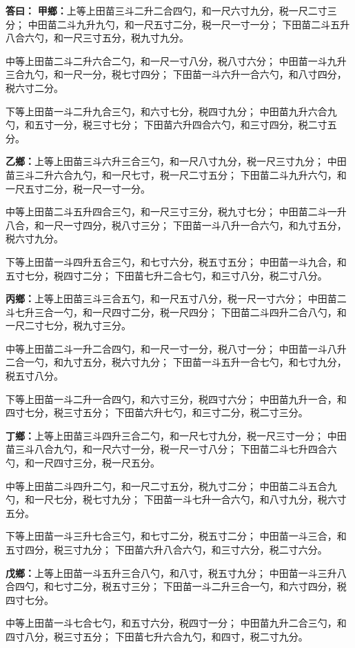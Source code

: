 \documentclass[11pt,a4paper]{article}
\newcommand{\Answer}[1]{\par\noindent\textbf{\color{answercolor}答曰：}#1\par}
\begin{document}
\Answer{
\textbf{甲鄉：}上等上田苗三斗二升二合四勺，和一尺六寸九分，税一尺二寸三分；
中田苗二斗九升九勺，和一尺五寸二分，税一尺一寸一分；
下田苗二斗五升八合六勺，和一尺三寸五分，税九寸九分。

中等上田苗二斗二升六合二勺，和一尺一寸八分，税八寸六分；
中田苗一斗九升三合九勺，和一尺一分，税七寸四分；
下田苗一斗六升一合六勺，和八寸四分，税六寸二分。

下等上田苗一斗二升九合三勺，和六寸七分，税四寸九分；
中田苗九升六合九勺，和五寸一分，税三寸七分；
下田苗六升四合六勺，和三寸四分，税二寸五分。

\textbf{乙鄉：}上等上田苗三斗六升三合三勺，和一尺八寸九分，税一尺三寸九分；
中田苗三斗二升六合九勺，和一尺七寸，税一尺二寸五分；
下田苗二斗九升六勺，和一尺五寸二分，税一尺一寸一分。

中等上田苗二斗五升四合三勺，和一尺三寸三分，税九寸七分；
中田苗二斗一升八合，和一尺一寸四分，税八寸三分；
下田苗一斗八升一合六勺，和九寸五分，税六寸九分。

下等上田苗一斗四升五合三勺，和七寸六分，税五寸五分；
中田苗一斗九合，和五寸七分，税四寸二分；
下田苗七升二合七勺，和三寸八分，税二寸八分。

\textbf{丙鄉：}上等上田苗三斗三合五勺，和一尺五寸八分，税一尺一寸六分；
中田苗二斗七升三合一勺，和一尺四寸二分，税一尺四分；
下田苗二斗四升二合八勺，和一尺二寸七分，税九寸三分。

中等上田苗二斗一升二合四勺，和一尺一寸一分，税八寸一分；
中田苗一斗八升二合一勺，和九寸五分，税六寸九分；
下田苗一斗五升一合七勺，和七寸九分，税五寸八分。

下等上田苗一斗二升一合四勺，和六寸三分，税四寸六分；
中田苗九升一合，和四寸七分，税三寸五分；
下田苗六升七勺，和三寸二分，税二寸三分。

\textbf{丁鄉：}上等上田苗三斗四升三合二勺，和一尺七寸九分，税一尺三寸一分；
中田苗三斗八合九勺，和一尺六寸一分，税一尺一寸八分；
下田苗二斗七升四合六勺，和一尺四寸三分，税一尺五分。

中等上田苗二斗四升二勺，和一尺二寸五分，税九寸二分；
中田苗二斗五合九勺，和一尺七分，税七寸九分；
下田苗一斗七升一合六勺，和八寸九分，税六寸五分。

下等上田苗一斗三升七合三勺，和七寸二分，税五寸二分；
中田苗一斗三合，和五寸四分，税三寸九分；
下田苗六升八合六勺，和三寸六分，税二寸六分。

\textbf{戊鄉：}上等上田苗一斗五升三合八勺，和八寸，税五寸九分；
中田苗一斗三升八合四勺，和七寸二分，税五寸三分；
下田苗一斗二升三合一勺，和六寸四分，税四寸七分。

中等上田苗一斗七合七勺，和五寸六分，税四寸一分；
中田苗九升二合三勺，和四寸八分，税三寸五分；
下田苗七升六合九勺，和四寸，税二寸九分。

}
\end{document}
